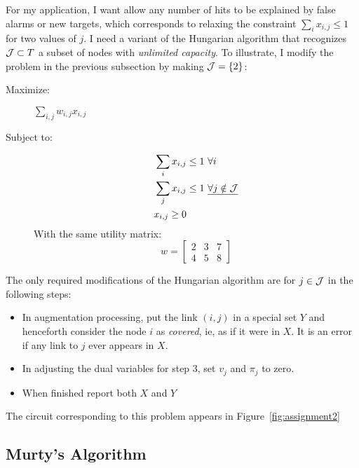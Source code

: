 \documentclass[12pt]{article}
\begin{document}
For my application, I want allow any number of hits to be explained by
false alarms or new targets, which corresponds to relaxing the
constraint $\sum_i x_{i,j} \leq 1$ for two values of $j$.  I need a
variant of the Hungarian algorithm that recognizes ${\cal J} \subset
T$ a subset of nodes with \emph{unlimited capacity}.  To illustrate, I
modify the problem in the previous subsection by making ${\cal J} =
\left\{2\right\}$:
\begin{description}
\item[Maximize:] $\sum_{i,j} w_{i,j} x_{i,j}$
\item[Subject to:]
  \begin{align*}
    \sum_i x_{i,j} &\leq 1 ~\forall i\\
    \sum_j x_{i,j} &\leq 1  ~\underline{\forall j \notin {\cal J}} \\
    x_{i,j} \geq 0
  \end{align*}
With the same utility matrix:
\begin{equation*}
  w =
  \begin{bmatrix}
    2 & 3 & 7 \\
    4 & 5 & 8
  \end{bmatrix}
\end{equation*}
\end{description}
The only required modifications of the Hungarian algorithm are for
$j\in {\cal J}$ in the following steps:
\begin{itemize}
\item In augmentation processing, put the link $(i,j)$ in a special
  set $Y$ and henceforth consider the node $i$ as \emph{covered}, ie,
  as if it were in $X$.  It is an error if any link to $j$ ever
  appears in $X$.
\item In adjusting the dual variables for step 3, set $v_j$ and
  $\pi_j$ to zero.
\item When finished report both $X$ and $Y$
\end{itemize}


The circuit corresponding to this problem appears in
Figure~\ref{fig:assignment2}
\begin{figure*}
  \centering
  \caption{Circuit equivalent of the assignment problem with no
    restriction on the number of $i$ nodes assigned to node $j=0$.}
  \label{fig:assignment2}
\end{figure*}

\subsection{Murty's Algorithm}
\label{sec:murty}
\end{document}
